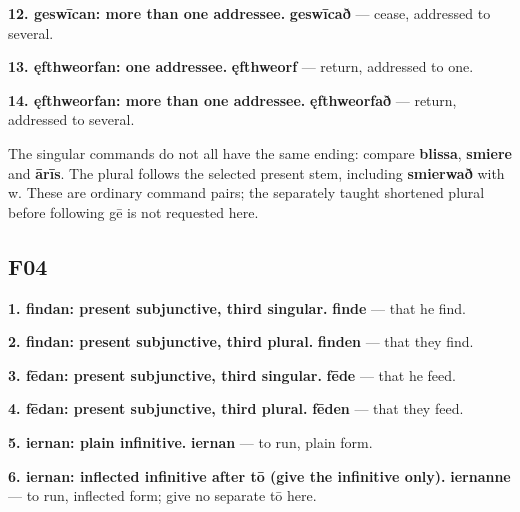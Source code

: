 \textbf{12. geswīcan: more than one addressee.} \textbf{geswīcað} — cease, addressed to several.

\textbf{13. ęfthweorfan: one addressee.} \textbf{ęfthweorf} — return, addressed to one.

\textbf{14. ęfthweorfan: more than one addressee.} \textbf{ęfthweorfað} — return, addressed to several.

The singular commands do not all have the same ending: compare \textbf{blissa}, \textbf{smiere} and \textbf{ārīs}. The plural follows the selected present stem, including \textbf{smierwað} with w. These are ordinary command pairs; the separately taught shortened plural before following gē is not requested here.

\subsection*{F04}

\textbf{1. findan: present subjunctive, third singular.} \textbf{finde} — that he find.

\textbf{2. findan: present subjunctive, third plural.} \textbf{finden} — that they find.

\textbf{3. fēdan: present subjunctive, third singular.} \textbf{fēde} — that he feed.

\textbf{4. fēdan: present subjunctive, third plural.} \textbf{fēden} — that they feed.

\textbf{5. iernan: plain infinitive.} \textbf{iernan} — to run, plain form.

\textbf{6. iernan: inflected infinitive after tō (give the infinitive only).} \textbf{iernanne} — to run, inflected form; give no separate tō here.

